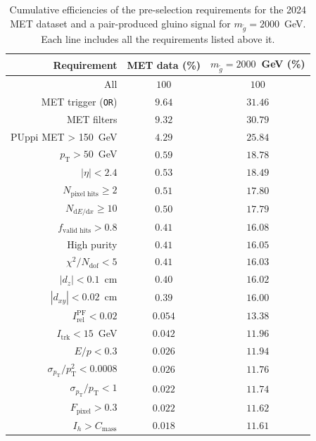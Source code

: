 \begin{table}[h!]
  \centering
  \footnotesize
  \renewcommand{\arraystretch}{1.4}
  \begin{tabular}{rcc}
    \toprule
    Requirement & MET data (\%) & $m_{\tilde{g}}=2000$~GeV (\%) \\
    \midrule
    All                                  & $100$ & $100$ \\
    MET trigger (\texttt{OR})            & $9.64$   & $31.46$  \\
    MET filters                          & $9.32$   & $30.79$  \\
    PUppi MET > 150~GeV                  & $4.29$   & $25.84$  \\
    $p_{\mathrm{T}} > 50$~GeV                       & $0.59$   & $18.78$  \\
    $|\eta| < 2.4$                       & $0.53$   & $18.49$  \\
    $N_{\text{pixel hits}} \geq 2$       & $0.51$   & $17.80$  \\
    $N_{\mathrm{d}E/\mathrm{d}x} \geq 10$& $0.50$   & $17.79$  \\
    $f_{\text{valid hits}} > 0.8$        & $0.41$   & $16.08$  \\
    High purity                          & $0.41$   & $16.05$  \\
    $\chi^{2}/N_{\text{dof}} < 5$        & $0.41$   & $16.03$  \\
    $|d_{z}| < 0.1$~cm                   & $0.40$   & $16.02$  \\
    $|d_{xy}| < 0.02$~cm                 & $0.39$   & $16.00$  \\
    $I_\textrm{rel}^\textrm{PF} < 0.02$  & $0.054$  & $13.38$  \\
    $I_{\text{trk}} < 15$~GeV            & $0.042$  & $11.96$  \\
    $E/p < 0.3$                          & $0.026$  & $11.94$  \\
    $\sigma_{p_{\mathrm{T}}}/p_{\mathrm{T}}^{2} < 0.0008$      & $0.026$  & $11.76$  \\
    $\sigma_{p_{\mathrm{T}}}/p_{\mathrm{T}} < 1$               & $0.022$  & $11.74$  \\
    $F_\textrm{pixel} > 0.3$             & $0.022$  & $11.62$  \\
    $I_h > C_\mathrm{mass}$              & $0.018$  & $11.61$  \\
    \bottomrule
  \end{tabular}
  \caption{Cumulative efficiencies of the pre-selection requirements for the 2024 MET dataset and a pair-produced gluino signal for $m_{\tilde{g}} = 2000$~GeV. Each line includes all the requirements listed above it.}
  \label{tab:preselection}
\end{table}


